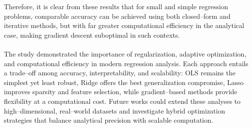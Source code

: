 \documentclass[
 reprint,            %
 amsmath,amssymb,
 aps,
]{revtex4-2}
\begin{document}
Therefore, it is clear from these results that for small and simple regression problems, comparable accuracy can be achieved using both closed–form and iterative methods, but with far greater computational efficiency in the analytical case, making gradient descent suboptimal in such contexts.\\\\
The study demonstrated the importance of regularization, adaptive optimization, and computational efficiency in modern regression analysis.  
Each approach entails a trade–off among accuracy, interpretability, and scalability:  
OLS remains the simplest yet least robust, Ridge offers the best generalization compromise, Lasso improves sparsity and feature selection, while gradient–based methods provide flexibility at a computational cost.  
Future works could extend these analyses to high–dimensional, real–world datasets and investigate hybrid optimization strategies that balance analytical precision with scalable computation.


\end{document}

